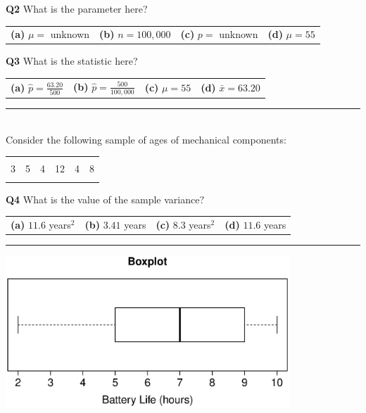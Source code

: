 \documentclass[12pt]{article}
\begin{document}
{\bf Q2} What is the parameter here?\\[0.2cm]
\begin{tabular}{cccc}
{\bf(a)} $\mu =$ unknown & {\bf(b)} $n = 100,000$ & {\bf(c)} $p =$ unknown & {\bf(d)} $\mu = 55$ \\[0.6cm]
\end{tabular}

{\bf Q3} What is the statistic here?\\[0.2cm]
\begin{tabular}{cccc}
{\bf(a)} $\hat p = \frac{63.20}{500}$ & {\bf(b)} $\hat p = \frac{500}{100,000}$ & {\bf(c)} $\mu = 55$ & {\bf(d)} $\bar x = 63.20$ \\[0.6cm]
\end{tabular}



\rule{\linewidth}{1pt}

\quad\\
Consider the following sample of ages of mechanical components:
\begin{center}
\begin{tabular}{|cccccc|}
\hline
&&&&&\\[-0.4cm]
3 & 5 & 4 & 12 & 4 & 8\\
\hline
\multicolumn{6}{c}{}
\end{tabular}
\end{center}


{\bf Q4} What is the value of the sample variance?\\[0.2cm]
\begin{tabular}{cccc}
{\bf(a)} $11.6$ years$^2$ & {\bf(b)} $3.41$ years & {\bf(c)} $8.3$ years$^2$ & {\bf(d)} $11.6$ years \\[0.6cm]
\end{tabular}

\quad


\rule{\linewidth}{1pt}

\begin{center}
\includegraphics[width=0.8\textwidth, trim = 1.3cm 0.6cm 1cm 0.8cm, clip]{BoxplotB}
\end{center}
\end{document}
